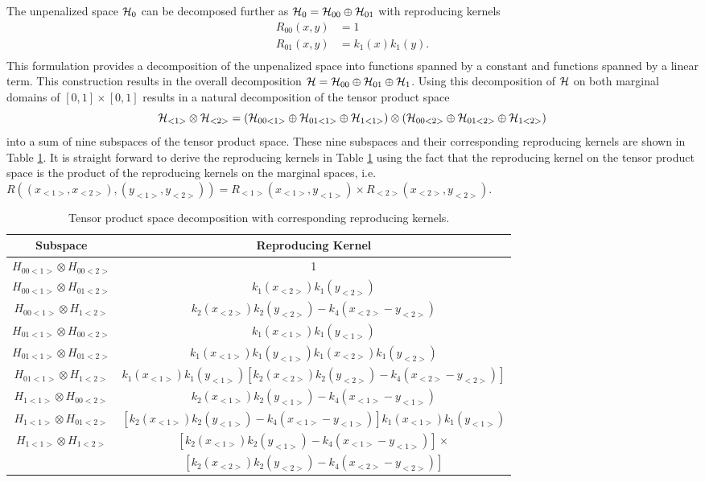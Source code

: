  The unpenalized space $\mathcal{H}_0$ can be decomposed further as $\mathcal{H}_0 = \mathcal{H}_{00} \oplus \mathcal{H}_{01}$ with reproducing kernels
  \begin{align*}
  R_{00}(x,y) &= 1\\
   R_{01}(x,y) &= k_1(x)k_1(y).\\
  \end{align*} 
This formulation provides a decomposition of the unpenalized space into functions spanned by a constant and functions spanned by a linear term. This construction results in the overall decomposition $\mathcal{H}= \mathcal{H}_{00} \oplus \mathcal{H}_{01} \oplus \mathcal{H}_1$. Using this decomposition of $\mathcal{H}$ on both marginal domains of $[0,1] \times [0,1]$ results in a natural decomposition of the tensor product space 
\[
\mathcal{H}_{<1>} \otimes \mathcal{H}_{<2>} = (\mathcal{H}_{00<1>} \oplus \mathcal{H}_{01<1>} \oplus \mathcal{H}_{1<1>})\otimes (\mathcal{H}_{00<2>} \oplus \mathcal{H}_{01<2>} \oplus \mathcal{H}_{1<2>})
\]
into a sum of nine subspaces of the tensor product space. These nine subspaces and their corresponding reproducing kernels are shown in Table \ref{tab:tp decomp}. It is straight forward to derive the reproducing kernels in Table \ref{tab:tp decomp} using the fact that the reproducing kernel on the tensor product space is the product of the reproducing kernels on the marginal spaces, i.e. $R((x_{<1>}, x_{<2>}), (y_{<1>}, y_{<2>}) ) = R_{<1>}(x_{<1>}, y_{<1>})\times R_{<2>}(x_{<2>}, y_{<2>})$.

\begin{table}[h]
\centering
\caption{Tensor product space decomposition with corresponding reproducing kernels.}
\label{tab:tp decomp}
\begin{tabular}{|c|c|}
\hline 
Subspace & Reproducing Kernel\tabularnewline
\hline
\hline 
$H_{00<1>}\otimes H_{00<2>}$ & 1\tabularnewline
\hline 
$H_{00<1>}\otimes H_{01<2>}$ & $k_{1}(x_{<2>})k_{1}(y_{<2>})$\tabularnewline
\hline 
$H_{00<1>}\otimes H_{1<2>}$ & $k_2(x_{<2>})k_2(y_{<2>}) - k_4(x_{<2>} - y_{<2>})$\tabularnewline
\hline 
$H_{01<1>}\otimes H_{00<2>}$ & $k_1(x_{<1>})k_1(y_{<1>})$ \tabularnewline
\hline 
$H_{01<1>}\otimes H_{01<2>}$ & $k_1(x_{<1>})k_1(y_{<1>})k_1(x_{<2>})k_1(y_{<2>})$ \tabularnewline
\hline 
$H_{01<1>}\otimes H_{1<2>}$ & $k_1(x_{<1>})k_1(y_{<1>})[k_2(x_{<2>})k_2(y_{<2>}) - k_4(x_{<2>} - y_{<2>})]$\tabularnewline
\hline 
$H_{1<1>}\otimes H_{00<2>}$ & $k_2(x_{<1>})k_2(y_{<1>}) - k_4(x_{<1>} - y_{<1>})$\tabularnewline
\hline 
$H_{1<1>}\otimes H_{01<2>}$ & $[k_2(x_{<1>})k_2(y_{<1>}) - k_4(x_{<1>} - y_{<1>})]k_1(x_{<1>})k_1(y_{<1>})$\tabularnewline
\hline 
$H_{1<1>}\otimes H_{1<2>}$ & $[k_2(x_{<1>})k_2(y_{<1>}) - k_4(x_{<1>} - y_{<1>})]\times$ \tabularnewline
& $[k_2(x_{<2>})k_2(y_{<2>}) - k_4(x_{<2>} - y_{<2>})]$\tabularnewline
\hline
\end{tabular}
\end{table}

